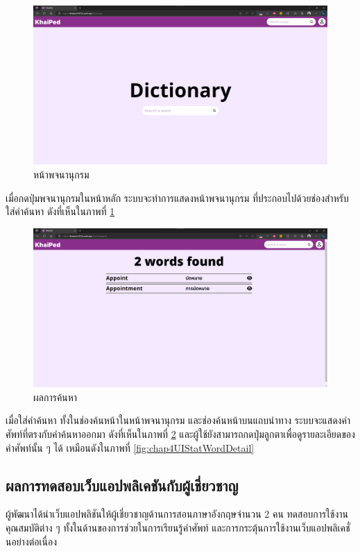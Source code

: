 \documentclass[12pt,oneside,openright,a4paper]{cpe-thai-project}
\begin{document}
\pagebreak
\begin{figure}[!h]\centering
	\includegraphics[width=\textwidth, keepaspectratio=true]{image/chap4/UI/dict/dict.png}
	\caption{{หน้าพจนานุกรม}}\label{fig:chap4UIDict}
\end{figure}
\hspace{1cm}
เมื่อกดปุ่มพจนานุกรมในหน้าหลัก ระบบจะทำการแสดงหน้าพจนานุกรม ที่ประกอบไปด้วยช่องสำหรับใส่คำค้นหา
ดังที่เห็นในภาพที่ \ref{fig:chap4UIDict}

\begin{figure}[!h]\centering
	\includegraphics[width=\textwidth, keepaspectratio=true]{image/chap4/UI/dict/result.png}
	\caption{{ผลการค้นหา}}\label{fig:chap4UIDictResult}
\end{figure}
\hspace{1cm}
เมื่อใส่คำค้นหา ทั้งในช่องค้นหน้าในหน้าพจนานุกรม และช่องค้นหน้าบนแถบนำทาง ระบบจะแสดงคำศัพท์ที่ตรงกับคำค้นหาออกมา
ดังที่เห็นในภาพที่ \ref{fig:chap4UIDictResult} และผู้ใช้ยังสามารถกดปุ่มลูกตาเพื่อดูรายละเอียดของคำศัพท์นั้น ๆ ได้
เหมือนดังในภาพที่ \ref{fig:chap4UIStatWordDetail}

\pagebreak
\subsection{ผลการทดสอบเว็บแอปพลิเคชันกับผู้เชี่ยวชาญ}
\hspace{1cm}
ผู้พัฒนาได้นำเว็บแอปพลิชันให้ผู้เชี่ยวชาญด้านการสอนภาษาอังกฤษจำนวน 2 คน ทดสอบการใช้งานคุณสมบัติต่าง ๆ
ทั้งในด้านของการช่วยในการเรียนรู้คำศัพท์ และการกระตุ้นการใช้งานเว็บแอปพลิเคชั่นอย่างต่อเนื่อง
\end{document}
